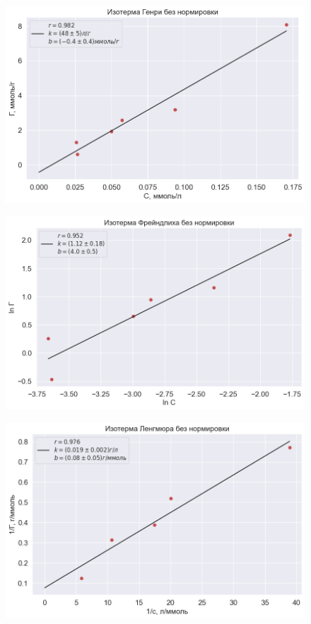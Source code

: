 \documentclass[a4paper,12pt]{article} %
\begin{document}
\begin{figure}[H]
    \centering
    \includegraphics[width=17cm]{Henri.png}
    \label{Henri}
\end{figure}

\begin{figure}[H]
    \centering
    \includegraphics[width=17cm]{FR.png}
    \label{FR}
\end{figure}

\begin{figure}[H]
    \centering
    \includegraphics[width=17cm]{leng.png}
    \label{leng}
\end{figure}
\end{document}

